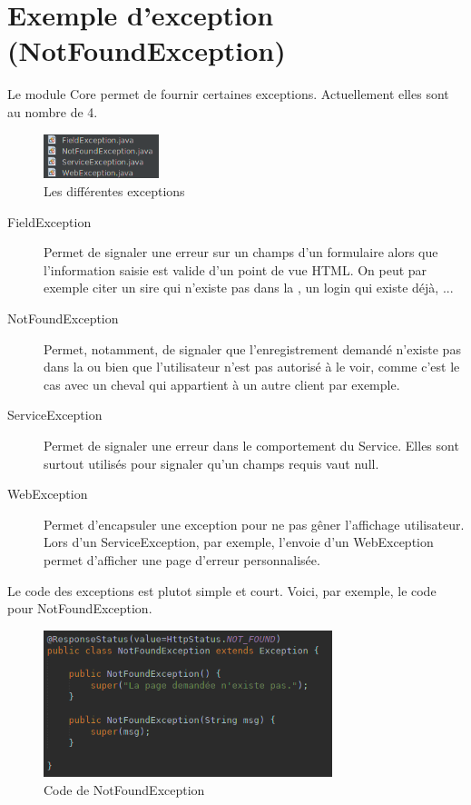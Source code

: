 	\section{Exemple d'exception (NotFoundException)}
		Le module Core permet de fournir certaines exceptions. Actuellement elles sont au nombre de 4.

		\begin{figure}[H]
			\centering\includegraphics[width=0.30\textwidth, keepaspectratio]{res/exceptions.png}
			\caption{Les différentes exceptions}
		\end{figure}

		\begin{description}
			\item[FieldException]{Permet de signaler une erreur sur un champs d'un formulaire alors que l'information saisie est valide d'un point de vue HTML. On peut par exemple citer un sire qui n'existe pas dans la \bdd{}, un login qui existe déjà, ...}
			\item[NotFoundException]{Permet, notamment, de signaler que l'enregistrement demandé n'existe pas dans la \bdd{} ou bien que l'utilisateur n'est pas autorisé à le voir, comme c'est le cas avec un cheval qui appartient à un autre client par exemple.}
			\item[ServiceException]{Permet de signaler une erreur dans le comportement du Service. Elles sont surtout utilisés pour signaler qu'un champs requis vaut null.}
			\item[WebException]{Permet d'encapsuler une exception pour ne pas gêner l'affichage utilisateur. Lors d'un ServiceException, par exemple, l'envoie d'un WebException permet d'afficher une page d'erreur personnalisée.}
		\end{description}

		Le code des exceptions est plutot simple et court. Voici, par exemple, le code pour NotFoundException.

		\begin{figure}[H]
			\centering\includegraphics[width=0.75\textwidth, keepaspectratio]{res/NotFoundException.png}
			\caption{Code de NotFoundException}
		\end{figure}

